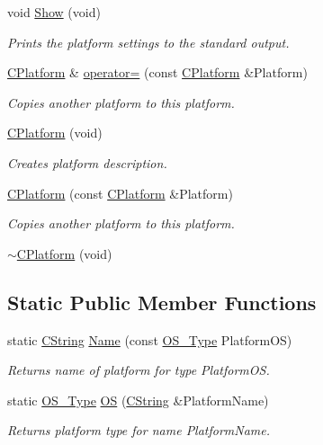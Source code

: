 \begin{DoxyCompactItemize}
void \hyperlink{classCPlatform_a5b06661996b93902f8bcdd9121b1cae4}{Show} (void)
\begin{DoxyCompactList}\small\item\em Prints the platform settings to the standard output. \end{DoxyCompactList}\item 
\hyperlink{classCPlatform}{C\-Platform} \& \hyperlink{classCPlatform_a9015888e50ea357dd59e63ae4e42b7bb}{operator=} (const \hyperlink{classCPlatform}{C\-Platform} \&Platform)
\begin{DoxyCompactList}\small\item\em Copies another platform to this platform. \end{DoxyCompactList}\item 
\hyperlink{classCPlatform_a36f6a24d6b25cbbe87e021c099871afd}{C\-Platform} (void)
\begin{DoxyCompactList}\small\item\em Creates platform description. \end{DoxyCompactList}\item 
\hyperlink{classCPlatform_ae5238b66d09bc955ec5f1668771846ad}{C\-Platform} (const \hyperlink{classCPlatform}{C\-Platform} \&Platform)
\begin{DoxyCompactList}\small\item\em Copies another platform to this platform. \end{DoxyCompactList}\item 
\hyperlink{classCPlatform_ab6c7863f2ad73b2d6176531c5c7aef23}{$\sim$\-C\-Platform} (void)
\end{DoxyCompactItemize}
\subsection*{Static Public Member Functions}
\begin{DoxyCompactItemize}
\item 
static \hyperlink{classCString}{C\-String} \hyperlink{classCPlatform_aaafbc804cfe1a921cfb8e6eccad1572f}{Name} (const \hyperlink{classCPlatform_a2fb735c63c53052f79629e338bb0f535}{O\-S\-\_\-\-Type} Platform\-O\-S)
\begin{DoxyCompactList}\small\item\em Returns name of platform for type {\itshape Platform\-O\-S}. \end{DoxyCompactList}\item 
static \hyperlink{classCPlatform_a2fb735c63c53052f79629e338bb0f535}{O\-S\-\_\-\-Type} \hyperlink{classCPlatform_a5483e58aaa1fb254f18d04310d2b5901}{O\-S} (\hyperlink{classCString}{C\-String} \&Platform\-Name)
\begin{DoxyCompactList}\small\item\em Returns platform type for name {\itshape Platform\-Name}. \end{DoxyCompactList}\end{DoxyCompactItemize}
